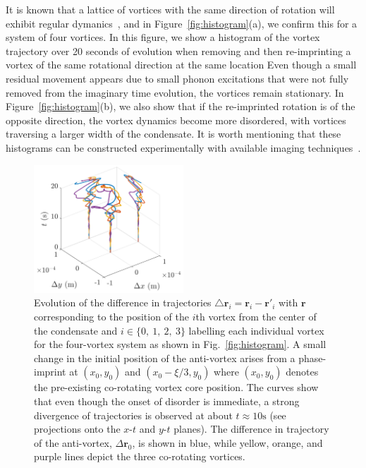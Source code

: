 It is known that a lattice of vortices with the same direction of rotation will exhibit regular dymanics~\cite{abo2001}, and in Figure~\ref{fig:histogram}(a), we confirm this for a system of four vortices.
In this figure, we show a histogram of the vortex trajectory over 20 seconds of evolution when removing and then re-imprinting a vortex of the same rotational direction at the same location
Even though a small residual movement appears due to small phonon excitations that were not fully removed from the imaginary time evolution, the vortices remain stationary.
In Figure~\ref{fig:histogram}(b), we also show that if the re-imprinted rotation is of the opposite direction, the vortex dynamics become more disordered, with vortices traversing a larger width of the condensate.
It is worth mentioning that these histograms can be constructed experimentally with available imaging techniques~\cite{wilson2015,freilich2010}.

\begin{figure}
\center \includegraphics[width=0.5\textwidth]{data/2d/evolution/evolution}

\caption{
Evolution of the difference in trajectories $\triangle \textbf{r}_i = \textbf{r}_{i}-\textbf{r}'_{i}$ with $\textbf{r}$ corresponding to the position of the $i$th vortex from the center of the condensate and $i\in \{0,\ 1,\ 2,\ 3\}$ labelling each individual vortex for the four-vortex system as shown in Fig.~\ref{fig:histogram}.
A small change in the initial position of the anti-vortex arises from a phase-imprint at $(x_{0},y_{0})$ and $(x_{0}-\xi/3,y_{0})$ where $(x_{0},y_{0})$ denotes the pre-existing co-rotating vortex core position.
The curves show that even though the onset of disorder is immediate, a strong divergence of trajectories is observed at about $t\approx 10 \text{s}$ (see projections onto the $x$-$t$ and $y$-$t$ planes).
The difference in trajectory of the anti-vortex, $\Delta \mathbf{r}_0$, is shown in blue, while yellow, orange, and purple lines depict the three co-rotating vortices.
}
\label{fig:evolution}
\end{figure}

